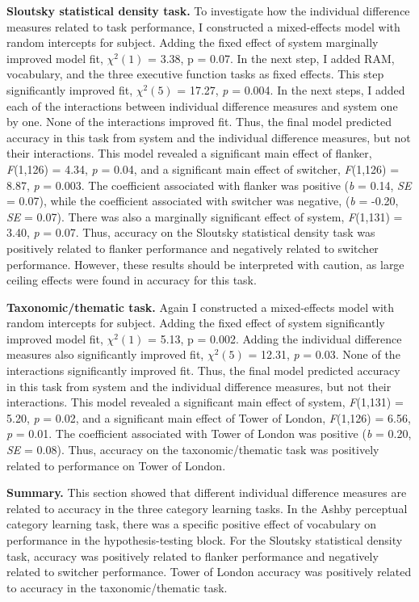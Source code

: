 \documentclass[../dissertation.tex]{subfiles}
\begin{document}
	\textbf{Sloutsky statistical density task.}  To investigate how the individual difference measures related to task performance, I constructed a mixed-effects model with random intercepts for subject. Adding the fixed effect of system marginally improved model fit,  $\chi^{2}(1)$ = 3.38, p = 0.07. In the next step, I added RAM, vocabulary, and the three executive function tasks as fixed effects. This step significantly improved fit, $\chi^{2}(5)$  = 17.27, \textit{p} = 0.004. In the next steps, I added each of the interactions between individual difference measures and system one by one. None of the interactions improved fit. Thus, the final model predicted accuracy in this task from system and the individual difference measures, but not their interactions. This model revealed a significant main effect of flanker, \textit{F}(1,126) = 4.34, \textit{p} = 0.04, and a significant main effect of switcher, \textit{F}(1,126) = 8.87, \textit{p} = 0.003. The coefficient associated with flanker was positive (\textit{b} = 0.14, \textit{SE} = 0.07), while the coefficient associated with switcher was negative, (\textit{b} = -0.20, \textit{SE} = 0.07). There was also a marginally significant effect of system, \textit{F}(1,131) = 3.40, \textit{p} = 0.07. Thus, accuracy on the Sloutsky statistical density task was positively related to flanker performance and negatively related to switcher performance. However, these results should be interpreted with caution, as large ceiling effects were found in accuracy for this task. \par
	\textbf{Taxonomic/thematic task.}  Again I constructed a mixed-effects model with random intercepts for subject. Adding the fixed effect of system significantly improved model fit,  $\chi^{2}(1)$ = 5.13, p = 0.002. Adding the individual difference measures also significantly improved fit, $\chi^{2}(5)$  = 12.31, \textit{p} = 0.03. None of the interactions significantly improved fit. Thus, the final model predicted accuracy in this task from system and the individual difference measures, but not their interactions. This model revealed a significant main effect of system, \textit{F}(1,131) = 5.20, \textit{p} = 0.02, and a significant main effect of Tower of London, \textit{F}(1,126) = 6.56, \textit{p} = 0.01. The coefficient associated with Tower of London was positive (\textit{b} = 0.20, \textit{SE} = 0.08). Thus, accuracy on the taxonomic/thematic task was positively related to performance on Tower of London. \par
	\textbf{Summary.} This section showed that different individual difference measures are related to accuracy in the three category learning tasks. In the Ashby perceptual category learning task, there was a specific positive effect of vocabulary on performance in the hypothesis-testing block. For the Sloutsky statistical density task, accuracy was positively related to flanker performance and negatively related to switcher performance. Tower of London accuracy was positively related to accuracy in the taxonomic/thematic task.
\end{document}
